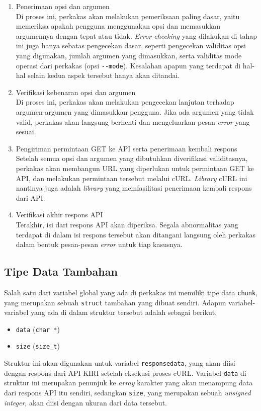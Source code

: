 \begin{enumerate}
	\item Penerimaan opsi dan argumen \\
	Di proses ini, perkakas akan melakukan pemeriksaan paling dasar, yaitu memeriksa apakah pengguna menggunakan opsi dan memasukkan argumennya dengan tepat atau tidak. \textit{Error checking} yang dilakukan di tahap ini juga hanya sebatas pengecekan dasar, seperti pengecekan validitas opsi yang digunakan, jumlah argumen yang dimasukkan, serta validitas mode operasi dari perkakas (opsi \verb|--mode|). Kesalahan apapun yang terdapat di hal-hal selain kedua aspek tersebut hanya akan ditandai.
	\item Verifikasi kebenaran opsi dan argumen \\
	Di proses ini, perkakas akan melakukan pengecekan lanjutan terhadap argumen-argumen yang dimasukkan pengguna. Jika ada argumen yang tidak valid, perkakas akan langsung berhenti dan mengeluarkan pesan \textit{error} yang sesuai.
	\item Pengiriman permintaan GET ke API serta penerimaan kembali respons\\
	Setelah semua opsi dan argumen yang dibutuhkan diverifikasi validitasnya, perkakas akan membangun URL yang diperlukan untuk permintaan GET ke API, dan melakukan permintaan tersebut melalui cURL. \textit{Library} cURL ini nantinya juga adalah \textit{library} yang memfasilitasi penerimaan kembali respons dari API.
	\item Verifikasi akhir respons API \\
	Terakhir, isi dari respons API akan diperiksa. Segala abnormalitas yang terdapat di dalam isi respons tersebut akan ditangani langsung oleh perkakas dalam bentuk pesan-pesan \textit{error} untuk tiap kasusnya.
\end{enumerate}

\subsection{Tipe Data Tambahan}
\label{sec:design-implementation-customtypes}

Salah satu dari variabel global yang ada di perkakas ini memiliki tipe data \verb|chunk|, yang merupakan sebuah \verb|struct| tambahan yang dibuat sendiri. Adapun variabel-variabel yang ada di dalam struktur tersebut adalah sebagai berikut.

\begin{itemize}
	\item \verb|data| (\verb|char *|)
	\item \verb|size| (\verb|size_t|)
\end{itemize}
\noindent
Struktur ini akan digunakan untuk variabel \verb|responsedata|, yang akan diisi dengan respons dari API KIRI setelah eksekusi proses cURL. Variabel \verb|data| di struktur ini merupakan penunjuk ke \textit{array} karakter yang akan menampung data dari respons API itu sendiri, sedangkan \verb|size|, yang merupakan sebuah \textit{unsigned integer}, akan diisi dengan ukuran dari data tersebut.

